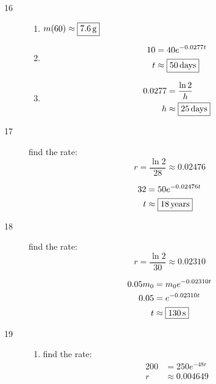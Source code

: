 \documentclass{exam}
\begin{document}
\begin{description}
      \item[16] 
        \begin{enumerate}[a]
          \item $m(60) \approx \boxed{\unit[7.6]{g}}$

          \item
            \begin{align*}
              10 & = 40 e^{-0.0277t} \\
              t  & \approx \boxed{\unit[50]{days}} \\
            \end{align*}

          \item
            \begin{align*}
              0.0277 & = \frac{\ln 2}{h} \\
              h      & \approx \boxed{\unit[25]{days}} \\
            \end{align*}
        \end{enumerate}

      \item[17]
        find the rate: 
        \[
          r = \frac{\ln 2}{28} \approx 0.02476
        \]

        \begin{align*}
          32 & = 50 e^{-0.02476 t} \\
          t  & \approx \boxed{\unit[18]{years}} \\
        \end{align*}

      \item[18]
        find the rate: 
        \[
          r = \frac{\ln 2}{30} \approx 0.02310
        \]

        \begin{align*}
          0.05m_0 & = m_0 e^{-0.02310 t} \\
          0.05    & =  e^{-0.02310 t} \\
          t       & \approx \boxed{\unit[130]{s}} \\
        \end{align*}

      \item[19]
        \begin{enumerate}[a]
          \item 
            find the rate:
            \begin{align*}
              200 & = 250 e^{-48r} \\
              r   & \approx 0.004649 \\
            \end{align*}


\end{enumerate}
\end{description}
\end{document}
